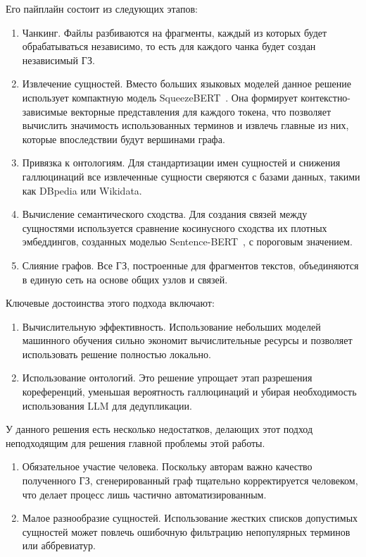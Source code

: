 Его пайплайн состоит из следующих этапов:
\begin{enumerate}
      \item Чанкинг. Файлы разбиваются на фрагменты, каждый из которых будет
            обрабатываться независимо, то есть для каждого чанка будет создан независимый ГЗ.
      \item Извлечение сущностей. Вместо больших языковых моделей данное решение использует
            компактную модель SqueezeBERT~\cite{Iandola_2020}.
            Она формирует контекстно-зависимые векторные представления для каждого токена,
            что позволяет вычислить значимость использованных терминов и извлечь главные из них,
            которые впоследствии будут вершинами графа.
      \item Привязка к онтологиям. Для стандартизации имен сущностей и снижения галлюцинаций
            все извлеченные сущности сверяются с базами данных, такими как DBpedia или Wikidata.
      \item Вычисление семантического сходства. Для создания связей между сущностями
            используется сравнение косинусного сходства их плотных эмбеддингов,
            созданных моделью Sentence-BERT~\cite{Reimers_2019}, с пороговым значением.
      \item Слияние графов. Все ГЗ, построенные для фрагментов
            текстов, объединяются в единую сеть на основе общих узлов и связей.
\end{enumerate}

Ключевые достоинства этого подхода включают:
\begin{enumerate}
      \item Вычислительную эффективность.
            Использование небольших моделей машинного обучения сильно экономит
            вычислительные ресурсы и позволяет использовать решение полностью локально.
      \item Использование онтологий. Это решение упрощает этап разрешения кореференций,
            уменьшая вероятность галлюцинаций
            и убирая необходимость использования LLM для дедупликации.
\end{enumerate}

У данного решения есть несколько недостатков,
делающих этот подход неподходящим для решения главной проблемы этой работы.

\begin{enumerate}
      \item Обязательное участие человека. Поскольку авторам важно качество полученного ГЗ,
            сгенерированный граф тщательно корректируется человеком, что делает процесс
            лишь частично автоматизированным.
      \item Малое разнообразие сущностей. Использование жестких списков допустимых сущностей
            может повлечь ошибочную фильтрацию непопулярных терминов или аббревиатур.
\end{enumerate}


